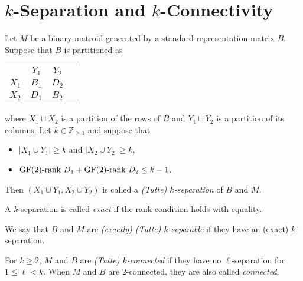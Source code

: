\section{$k$-Separation and $k$-Connectivity}

\begin{definition}[$k$-separation]
  \label{def:code_k_sep}
  Let $M$ be a binary matroid generated by a standard representation matrix $B$. Suppose that $B$ is partitioned as
  \begin{tabular}{cccc}
                                 & $Y_{1}$                      & $Y_{2}$                      &  \\ \cline{2-3}
    \multicolumn{1}{c|}{$X_{1}$} & \multicolumn{1}{c|}{$B_{1}$} & \multicolumn{1}{c|}{$D_{2}$} &  \\ \cline{2-3}
    \multicolumn{1}{c|}{$X_{2}$} & \multicolumn{1}{c|}{$D_{1}$} & \multicolumn{1}{c|}{$B_{2}$} &  \\ \cline{2-3}
  \end{tabular}
  where $X_{1} \sqcup X_{2}$ is a partition of the rows of $B$ and $Y_{1} \sqcup Y_{2}$ is a partition of its columns.
  Let $k \in \mathbb{Z}_{\geq 1}$ and suppose that
  \begin{itemize}
    \item $\left| X_{1} \cup Y_{1} \right| \geq k$ and $\left| X_{2} \cup Y_{2} \right| \geq k$,
    \item $\mathrm{GF}(2) \text{-rank } D_{1} + \mathrm{GF}(2) \text{-rank } D_{2} \leq k - 1$.
  \end{itemize}
  Then $\left( X_{1} \cup Y_{1}, X_{2} \cup Y_{2} \right)$ is called a \emph{(Tutte) $k$-separation} of $B$ and $M$.
\end{definition}

\begin{definition}
  \label{def:code_exact_k_sep}
  A $k$-separation is called \emph{exact} if the rank condition holds with equality.
\end{definition}

\begin{definition}[$k$-separability]
  \label{def:code_k_separability}
  We say that $B$ and $M$ are \emph{(exactly) (Tutte) $k$-separable} if they have an (exact) $k$-separation.
\end{definition}

\begin{definition}[$k$-connectivity]
  \label{def:code_k_conn}
  For $k \ge 2$, $M$ and $B$ are \emph{(Tutte) $k$-connected} if they have no $\ell$-separation for $1 \leq \ell < k$.
  When $M$ and $B$ are $2$-connected, they are also called \emph{connected}.
\end{definition}
